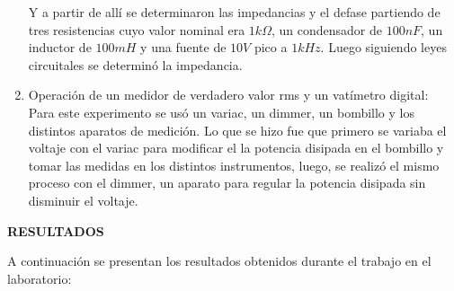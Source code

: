 \documentclass[12pt]{article}
\begin{document}
\begin{enumerate}
		Y a partir de allí se determinaron las impedancias y el defase partiendo de tres resistencias cuyo valor nominal era $1k\Omega$, un condensador de $100nF$, un inductor de $100mH$ y una fuente de $10V$ pico a $1kHz$. Luego siguiendo leyes circuitales se determinó la impedancia.
		
		\item Operación de un medidor de verdadero valor rms y un vatímetro digital:\\
		
		Para este experimento se usó un variac, un dimmer, un bombillo y los distintos aparatos de medición. Lo que se hizo fue que primero se variaba el voltaje con el variac para modificar el la potencia disipada en el bombillo y tomar las medidas en los distintos instrumentos, luego, se realizó el mismo proceso con el dimmer, un aparato para regular la potencia disipada sin disminuir el voltaje.
		
		
	\end{enumerate}
	
	\newpage
	
	\begin{center}
		\textbf{\large RESULTADOS}\\
	\end{center}
	
	A continuación se presentan los resultados obtenidos durante el trabajo en el laboratorio:
	
\end{document}
